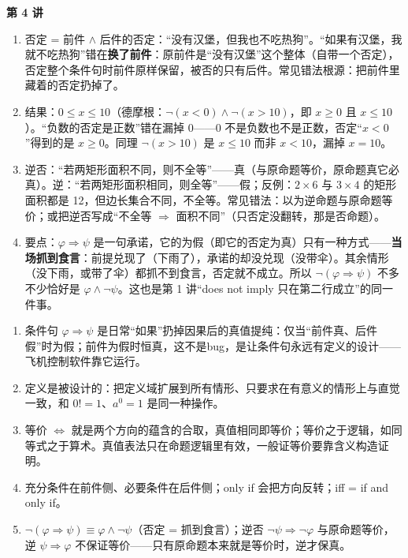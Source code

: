\documentclass[UTF8,a4paper,11pt]{ctexart}
\begin{document}
\textbf{第 4 讲}
\begin{enumerate}
  \item 否定 = 前件 $\land$ 后件的否定：“没有汉堡，但我也不吃热狗”。“如果有汉堡，我就不吃热狗”错在\textbf{换了前件}：原前件是“没有汉堡”这个整体（自带一个否定），否定整个条件句时前件原样保留，被否的只有后件。常见错法根源：把前件里藏着的否定扔掉了。
  \item 结果：$0 \le x \le 10$（德摩根：$\neg(x<0) \land \neg(x>10)$，即 $x \ge 0$ 且 $x \le 10$）。“负数的否定是正数”错在漏掉 0——0 不是负数也不是正数，否定“$x<0$”得到的是 $x \ge 0$。同理 $\neg(x>10)$ 是 $x \le 10$ 而非 $x < 10$，漏掉 $x = 10$。
  \item 逆否：“若两矩形面积不同，则不全等”——真（与原命题等价，原命题真它必真）。逆：“若两矩形面积相同，则全等”——假；反例：$2 \times 6$ 与 $3 \times 4$ 的矩形面积都是 12，但边长集合不同，不全等。常见错法：以为逆命题与原命题等价；或把逆否写成“不全等 $\Rightarrow$ 面积不同”（只否定没翻转，那是否命题）。
  \item 要点：$\varphi \Rightarrow \psi$ 是一句承诺，它的为假（即它的否定为真）只有一种方式——\textbf{当场抓到食言}：前提兑现了（下雨了），承诺的却没兑现（没带伞）。其余情形（没下雨，或带了伞）都抓不到食言，否定就不成立。所以 $\neg(\varphi \Rightarrow \psi)$ 不多不少恰好是 $\varphi \land \neg\psi$。这也是第 1 讲“does not imply 只在第二行成立”的同一件事。
\end{enumerate}

\vspace{1em}
\begin{keyconcept}
\begin{enumerate}
  \item 条件句 $\varphi \Rightarrow \psi$ 是日常“如果”扔掉因果后的真值提纯：仅当“前件真、后件假”时为假；前件为假时恒真，这不是bug，是让条件句永远有定义的设计——飞机控制软件靠它运行。
  \item 定义是被设计的：把定义域扩展到所有情形、只要求在有意义的情形上与直觉一致，和 $0! = 1$、$a^0 = 1$ 是同一种操作。
  \item 等价 $\Leftrightarrow$ 就是两个方向的蕴含的合取，真值相同即等价；等价之于逻辑，如同等式之于算术。真值表法只在命题逻辑里有效，一般证等价要靠含义构造证明。
  \item 充分条件在前件侧、必要条件在后件侧；only if 会把方向反转；iff = if and only if。
  \item $\neg(\varphi \Rightarrow \psi) \equiv \varphi \land \neg\psi$（否定 = 抓到食言）；逆否 $\neg\psi \Rightarrow \neg\varphi$ 与原命题等价，逆 $\psi \Rightarrow \varphi$ 不保证等价——只有原命题本来就是等价时，逆才保真。
\end{enumerate}
\end{keyconcept}
\end{document}
